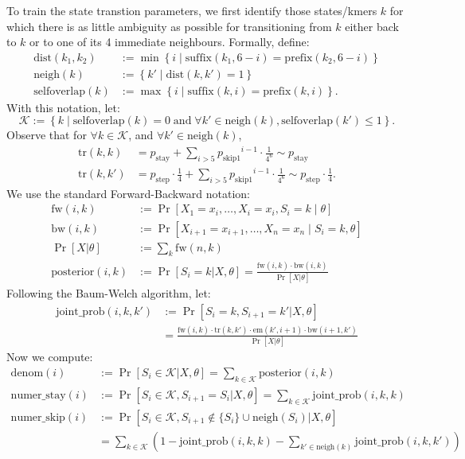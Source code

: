 \documentclass{article}
\newcommand{\pstay}{\ensuremath{p_\mathrm{stay}}}
\newcommand{\pskipone}{\ensuremath{p_\mathrm{skip1}}}
\newcommand{\pstep}{\ensuremath{p_\mathrm{step}}}
\newcommand{\suffix}{\ensuremath{\mathrm{suffix}}}
\newcommand{\prefix}{\ensuremath{\mathrm{prefix}}}
\newcommand{\fw}{\ensuremath{\mathrm{fw}}}
\newcommand{\bw}{\ensuremath{\mathrm{bw}}}
\newcommand{\posterior}{\ensuremath{\mathrm{posterior}}}
\begin{document}
To train the state transtion parameters, we first identify those states/kmers $k$ for which there is as little ambiguity as possible for transitioning from $k$ either back to $k$ or to one of its 4 immediate neighbours. Formally, define:
\begin{align*}
\mathrm{dist}(k_1, k_2) & := \min \left\{ i \; | \; \suffix(k_1, 6-i) = \prefix(k_2, 6-i) \right\}
\\
\mathrm{neigh}(k) & := \left\{ k' \; | \; \mathrm{dist}(k,k') = 1 \right\}
\\
\mathrm{selfoverlap}(k) & := \max \left\{ i \; | \; \suffix(k, i) = \prefix(k, i) \right\}.
\end{align*}
With this notation, let:
\[
\mathcal{K} := \left\{ k \; | \; \mathrm{selfoverlap}(k) = 0 \; \mathrm{and} \;
\forall k' \in \mathrm{neigh}(k), \mathrm{selfoverlap}(k') \le 1 \right\}.
\]
Observe that for $\forall k \in \mathcal{K}$, and $\forall k' \in \mathrm{neigh}(k)$,
\begin{align*}
\mathrm{tr}(k, k) & = \pstay + \sum_{i>5} \pskipone^{i-1} \cdot \frac{1}{4^6} \sim \pstay
\\
\mathrm{tr}(k, k') & = \pstep \cdot \frac{1}{4} + \sum_{i>5} \pskipone^{i-1} \cdot \frac{1}{4^6} \sim \pstep \cdot \frac{1}{4}.
\end{align*}
We use the standard Forward-Backward notation:
\begin{align*}
\fw(i, k) & := \Pr [ X_1 = x_i, \dots, X_i = x_i, S_i = k \; | \; \theta ]
\\
\bw(i, k) & := \Pr [ X_{i+1} = x_{i+1}, \dots, X_n = x_n \; | \; S_i = k, \theta ]
\\
\Pr [ X | \theta ] & := \sum_k \fw(n, k)
\\
\posterior(i, k) & := \Pr [ S_i = k | X, \theta ]
= \frac{\fw(i,k) \cdot \bw(i,k)}{\Pr[X | \theta]}
\end{align*}
Following the Baum-Welch algorithm, let:
\begin{align*}
\mathrm{joint\_prob}(i, k, k')
& := \Pr [ S_i = k, S_{i+1} = k' | X, \theta ]
\\
& = \frac{\fw(i, k) \cdot \mathrm{tr}(k, k') \cdot \mathrm{em}(k', i+1) \cdot \bw(i+1, k')}{\Pr[X | \theta]}
\end{align*}
Now we compute:
\begin{align*}
\mathrm{denom}(i)
& := \Pr [ S_i \in \mathcal{K} | X, \theta ]
= \sum_{k \in \mathcal{K}} \posterior(i, k)
\\
\mathrm{numer\_stay}(i)
& := \Pr [ S_i \in \mathcal{K}, S_{i+1} = S_i | X, \theta ]
= \sum_{k \in \mathcal{K}} \mathrm{joint\_prob}(i, k, k)
\\
\mathrm{numer\_skip}(i)
& := \Pr [ S_i \in \mathcal{K}, S_{i+1} \notin \{S_i\} \cup \mathrm{neigh}(S_i) | X, \theta ]
\\
& = \sum_{k \in \mathcal{K}} \left( 1 - \mathrm{joint\_prob}(i, k, k) - \sum_{k' \in \mathrm{neigh}(k)} \mathrm{joint\_prob}(i, k, k') \right)
\end{align*}
\end{document}
